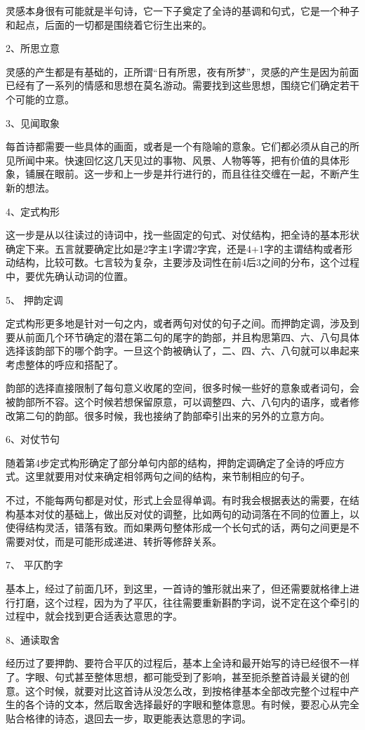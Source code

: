 \documentclass{article}
\begin{document}
灵感本身很有可能就是半句诗，它一下子奠定了全诗的基调和句式，它是一个种子和起点，后面的一切都是围绕着它衍生出来的。

2、所思立意

灵感的产生都是有基础的，正所谓``日有所思，夜有所梦''，灵感的产生是因为前面已经有了一系列的情感和思想在莫名游动。需要找到这些思想，围绕它们确定若干个可能的立意。

3、见闻取象

每首诗都需要一些具体的画面，或者是一个有隐喻的意象。它们都必须从自己的所见所闻中来。快速回忆这几天见过的事物、风景、人物等等，把有价值的具体形象，铺展在眼前。这一步和上一步是并行进行的，而且往往交缠在一起，不断产生新的想法。

4、定式构形

这一步是从以往读过的诗词中，找一些固定的句式、对仗结构，把全诗的基本形状确定下来。五言就要确定比如是2字主1字谓2字宾，还是4+1字的主谓结构或者形动结构，比较可数。七言较为复杂，主要涉及词性在前4后3之间的分布，这个过程中，要优先确认动词的位置。

5、 押韵定调

定式构形更多地是针对一句之内，或者两句对仗的句子之间。而押韵定调，涉及到要从前面几个环节确定的潜在第二句的尾字的韵部，并且构思第四、六、八句具体选择该韵部下的哪个韵字。一旦这个韵被确认了，二、四、六、八句就可以串起来考虑整体的呼应和搭配了。

韵部的选择直接限制了每句意义收尾的空间，很多时候一些好的意象或者词句，会被韵部所不容。这个时候若想保留原意，可以调整四、六、八句内的语序，或者修改第二句的韵部。很多时候，我也接纳了韵部牵引出来的另外的立意方向。

6、对仗节句

随着第4步定式构形确定了部分单句内部的结构，押韵定调确定了全诗的呼应方式。这里就要用对仗来确定相邻两句之间的结构，来节制相应的句子。

不过，不能每两句都是对仗，形式上会显得单调。有时我会根据表达的需要，在结构基本对仗的基础上，做出反对仗的调整，比如两句的动词落在不同的位置上，以使得结构灵活，错落有致。而如果两句整体形成一个长句式的话，两句之间更是不需要对仗，而是可能形成递进、转折等修辞关系。

7、 平仄酌字

基本上，经过了前面几环，到这里，一首诗的雏形就出来了，但还需要就格律上进行打磨，这个过程，因为为了平仄，往往需要重新斟酌字词，说不定在这个牵引的过程中，就会找到更合适表达意思的字。

8、通读取舍

经历过了要押韵、要符合平仄的过程后，基本上全诗和最开始写的诗已经很不一样了。字眼、句式甚至整体思想，都可能受到了影响，甚至扼杀整首诗最关键的创意。这个时候，就要对比这首诗从没怎么改，到按格律基本全部改完整个过程中产生的各个诗的文本，然后取舍选择最好的字眼和整体意思。有时候，要忍心从完全贴合格律的诗态，退回去一步，取更能表达意思的字词。
\end{document}
